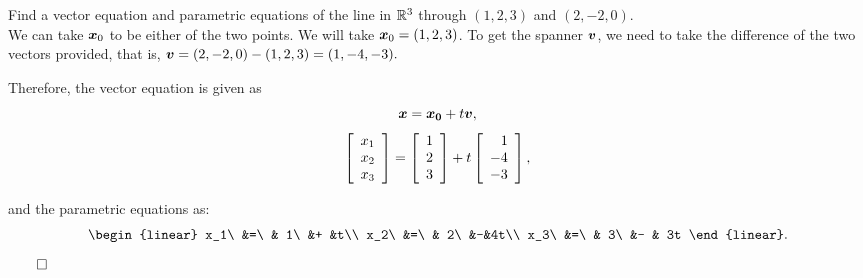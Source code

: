 \begin{Exam}  Find a vector equation and parametric equations of the line in $\mathbb{R}^3$ through $(1, 2, 3)$ and $(2, -2, 0)$.\\

We can take $\boldsymbol x_0$ to be either of the two points. We will take $\boldsymbol x_0 = (1,2,3)$. To get the spanner $\boldsymbol v$, we need to take the difference of the two vectors provided, that is,
$\boldsymbol v = (2,-2,0) - (1,2,3) = (1,-4,-3).$ 
\begin{multicols}{2}
Therefore, the vector equation is given as \[\boldsymbol x = \boldsymbol{x_0} + t\boldsymbol v,\] 
\[\left[\begin{array}{r} x_1\\x_2\\x_3 \end{array}\right] = \left[\begin{array}{r} 1\\2\\3 \end{array}\right] + t\left[\begin{array}{r} 1\\-4\\-3 \end{array}\right],\]
\columnbreak 

\mbox{}\vfill and the parametric equations as: 
\[\begin{linear}
x_1\ &=\ & 1\ &+ &t\\
x_2\ &=\ & 2\ &-&4t\\
x_3\ &=\ & 3\ &- & 3t
\end{linear}.\]$\hfill\qedhere$
\end{multicols}
\end{Exam}

